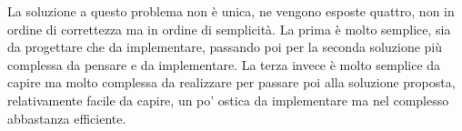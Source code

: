 La soluzione a questo problema non è unica, ne vengono esposte quattro, non in ordine di correttezza ma in ordine di semplicità. La prima è molto semplice, sia da progettare che da implementare, passando poi per la seconda soluzione più complessa da pensare e da implementare. La terza invece è molto semplice da capire ma molto complessa da realizzare per passare poi alla soluzione proposta, relativamente facile da capire, un po' ostica da implementare ma nel complesso abbastanza efficiente.